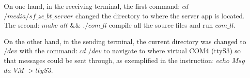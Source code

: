 On one hand, in the receiving terminal, the first command: \textit{$cd$} \textit{$/media/sf\_ze\_bt\_server$}
changed the directory to where the server app is located. The second: \textit{$make$} \textit{$all$} \textit{$\&\&$ $./com\_ll$} compile all the source files and run \textit{$com\_ll$}.

On the other hand, in the sending terminal, the current directory was changed to \textit{\textit{$/dev$}} with the command: \textit{$cd$} \textit{$/dev$}
to navigate to where virtual COM4 (ttyS3) so that messages could be sent through, as exemplified in the instruction: \textit{$echo$ $Msg$ $da$ $VM$} \textit{$> ttyS3$}. 

